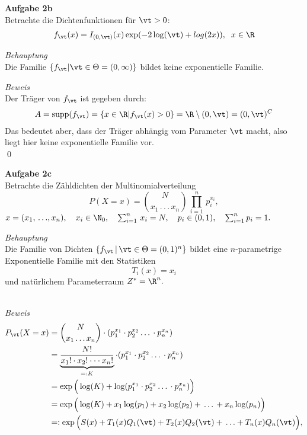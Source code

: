 \documentclass[12pt]{article}
\begin{document}
        \begin{description}
            \item{\textbf{Aufgabe 2b}\\
            Betrachte die Dichtenfunktionen für $\vt>0$:
            \begin{align*}
                f_{\vt}(x)=I_{(0,\vt)}(x)\exp(-2\log(\vt)+log(2x)),\hspace{2mm} x\in\R 
            \end{align*}
            }
            \item{\textit{Behauptung}\quad\\
            Die Familie $\{f_{\vt}|\vt\in\Theta=(0,\infty)\}$ bildet keine exponentielle Familie.
            }
            \item{\textit{Beweis}\quad\\
            Der Träger von $f_{\vt}$ ist gegeben durch:
            \begin{align*}
                A=\text{supp}(f_{\vt})=\{x\in\R|f_{\vt}(x)>0\}=\R\setminus(0,\vt)=(0,\vt)^C
            \end{align*}
            Das bedeutet aber, dass der Träger abhängig vom Parameter $\vt$ macht, also liegt hier keine exponentielle Familie vor.
            \\ \xtab \qed
            }
            \item{\textbf{Aufgabe 2c}\\ Betrachte die Zähldichten der Multinomialverteilung $$P(X = x) = {N \choose x_1\, .\,.\,.\, x_n} \, \prod_{i = 1}^n \, p_i^{x_i},$$  $x = (x_1,\,.\,.\,., x_n), \quad x_i \in \N_0, \quad\sum_{i=1}^n \,x_i = N, \quad p_i \in (0,1), \quad \sum_{i=1}^n p_i = 1.$
        }
            \item{\textit{Behauptung} \\ Die Familie von Dichten $\{f_{\vt}\,|\,\vt\in\Theta = (0,1)^n\}$ bildet eine $n$-parametrige Exponentielle Familie mit den Statistiken $$T_i (x) = x_i$$
        und natürlichem Parameterraum $Z^* = \R^n.$\\\\
        }
        \item{\textit{Beweis}
        \begin{equation*}\begin{split} 
        P_\vt(X = x) &= {N \choose x_1\, .\,.\,.\, x_n} \cdot (p_1^{x_1} \cdot p_2^{x_2} \,.\,.\,. \, \cdot p_n^{x_n}) \\&= \underbrace{\frac{N!}{x_1! \cdot x_2! \cdot \cdot \cdot x_n!}}_{=: K} \cdot (p_1^{x_1} \cdot p_2^{x_2} \,.\,.\,. \, \cdot p_n^{x_n}) \\&= \exp\Big(\log(K) + \log(p_1^{x_1} \cdot p_2^{x_2} \,.\,.\,. \, \cdot p_n^{x_n})\Big) \\&= \exp\Big(\log(K) + x_1 \log(p_1) + x_2 \log(p_2) + \,.\,.\,. \, + x_n \log(p_n)\Big) \\&=: \exp\Big( S(x) + T_1(x) Q_1(\vt) + T_2(x) Q_2(\vt) + \,.\,.\,. + T_n(x) Q_n(\vt) \Big),

\end{split}
\end{equation*}}
\end{description}
\end{document}
